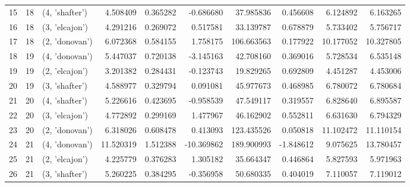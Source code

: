 \begin{tabular}{lrlrrrrrrr}
15 &     18 &  (4, 'shafter') &   4.508409 &   0.365282 &  -0.686680 &   37.985836 &  0.456608 &   6.124892 &   6.163265 \\
16 &     18 &  (3, 'elcajon') &   4.291216 &   0.269072 &   0.517581 &   33.139787 &  0.678879 &   5.733402 &   5.756717 \\
17 &     18 &  (2, 'donovan') &   6.072368 &   0.584155 &   1.758175 &  106.663563 &  0.177922 &  10.177052 &  10.327805 \\
18 &     19 &  (4, 'donovan') &   5.447037 &   0.720138 &  -3.145163 &   42.708160 &  0.369016 &   5.728534 &   6.535148 \\
19 &     19 &  (2, 'elcajon') &   3.201382 &   0.284431 &  -0.123743 &   19.829265 &  0.692809 &   4.451287 &   4.453006 \\
20 &     19 &  (3, 'shafter') &   4.588977 &   0.329794 &   0.091081 &   45.977673 &  0.468985 &   6.780072 &   6.780684 \\
21 &     20 &  (4, 'shafter') &   5.226616 &   0.423695 &  -0.958539 &   47.549117 &  0.319557 &   6.828640 &   6.895587 \\
22 &     20 &  (3, 'elcajon') &   4.772892 &   0.299169 &   1.477967 &   46.162902 &  0.552811 &   6.631630 &   6.794329 \\
23 &     20 &  (2, 'donovan') &   6.318026 &   0.608478 &   0.413093 &  123.435526 &  0.050818 &  11.102472 &  11.110154 \\
24 &     21 &  (4, 'donovan') &  11.520319 &   1.512388 & -10.369862 &  189.900993 & -1.848612 &   9.075625 &  13.780457 \\
25 &     21 &  (2, 'elcajon') &   4.225779 &   0.376283 &   1.305182 &   35.664347 &  0.446864 &   5.827593 &   5.971963 \\
26 &     21 &  (3, 'shafter') &   5.260225 &   0.384295 &  -0.356958 &   50.680335 &  0.404019 &   7.110057 &   7.119012 \\
\bottomrule
\end{tabular}
